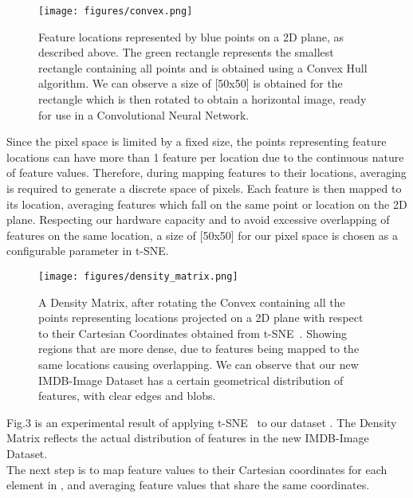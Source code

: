 \documentclass[conference]{IEEEtran}
\begin{document}
                \begin{figure}[htpb]
                \centerline{\texttt{[image: figures/convex.png]}}
                \caption{Feature locations represented by blue points on a 2D plane, as described above. The green rectangle represents the smallest rectangle containing all points and is obtained using a Convex Hull algorithm. We can observe a size of [50x50] is obtained for the rectangle which is then rotated to obtain a horizontal image, ready for use in a Convolutional Neural Network.}
                \label{figure-2}
                \end{figure}
                
                Since the pixel space is limited by a fixed size, the points representing feature locations can have more than 1 feature per location due to the continuous nature of feature values. Therefore, during mapping features to their locations, averaging is required to generate a discrete space of pixels. Each feature is then mapped to its location, averaging features which fall on the same point or location on the 2D plane. Respecting our hardware capacity and to avoid excessive overlapping of features on the same location, a size of [50x50] for our pixel space is chosen as a configurable parameter in t-SNE. 
                
                \begin{figure}[htpb]
                \centerline{\texttt{[image: figures/density\_matrix.png]}}
                \caption{A Density Matrix, after rotating the Convex containing all the points representing locations projected on a 2D plane with respect to their Cartesian Coordinates obtained from t-SNE~\cite{tsne}. Showing regions that are more dense, due to features being mapped to the same locations causing overlapping. We can observe that our new IMDB-Image Dataset has a certain geometrical distribution of features, with clear edges and blobs.}
                \label{figure-3}
                \end{figure}
              
              
              Fig.3 is an experimental result of applying t-SNE~\cite{tsne} to our dataset . The Density Matrix reflects the actual distribution of features in the new IMDB-Image Dataset. \\ The next step is to map feature values to their Cartesian coordinates for each element in , and averaging feature values that share the same coordinates.\newline
                
\end{document}
